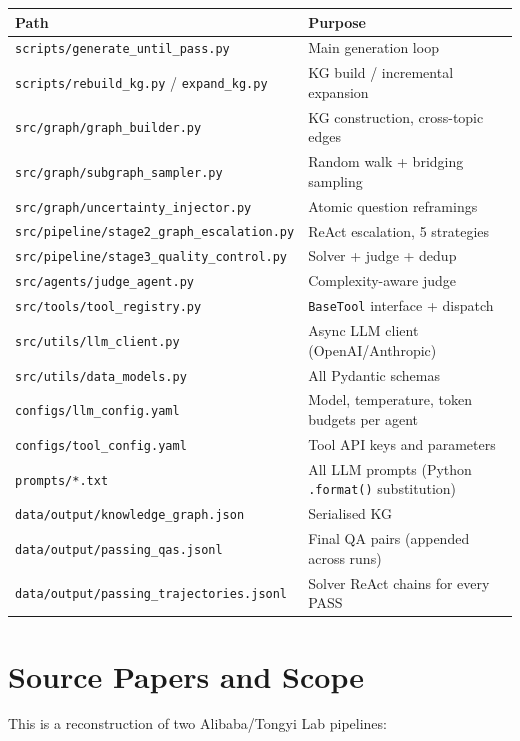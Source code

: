 \documentclass[11pt,a4paper]{article}
\begin{document}
\begin{tabular}{ll}
\toprule
\textbf{Path} & \textbf{Purpose} \\
\midrule
\texttt{scripts/generate\_until\_pass.py} & Main generation loop \\
\texttt{scripts/rebuild\_kg.py} / \texttt{expand\_kg.py} & KG build / incremental expansion \\
\texttt{src/graph/graph\_builder.py} & KG construction, cross-topic edges \\
\texttt{src/graph/subgraph\_sampler.py} & Random walk + bridging sampling \\
\texttt{src/graph/uncertainty\_injector.py} & Atomic question reframings \\
\texttt{src/pipeline/stage2\_graph\_escalation.py} & ReAct escalation, 5 strategies \\
\texttt{src/pipeline/stage3\_quality\_control.py} & Solver + judge + dedup \\
\texttt{src/agents/judge\_agent.py} & Complexity-aware judge \\
\texttt{src/tools/tool\_registry.py} & \texttt{BaseTool} interface + dispatch \\
\texttt{src/utils/llm\_client.py} & Async LLM client (OpenAI/Anthropic) \\
\texttt{src/utils/data\_models.py} & All Pydantic schemas \\
\texttt{configs/llm\_config.yaml} & Model, temperature, token budgets per agent \\
\texttt{configs/tool\_config.yaml} & Tool API keys and parameters \\
\texttt{prompts/*.txt} & All LLM prompts (Python \texttt{.format()} substitution) \\
\texttt{data/output/knowledge\_graph.json} & Serialised KG \\
\texttt{data/output/passing\_qas.jsonl} & Final QA pairs (appended across runs) \\
\texttt{data/output/passing\_trajectories.jsonl} & Solver ReAct chains for every PASS \\
\bottomrule
\end{tabular}

\section{Source Papers and Scope}

This is a reconstruction of two Alibaba/Tongyi Lab pipelines:
\end{document}
